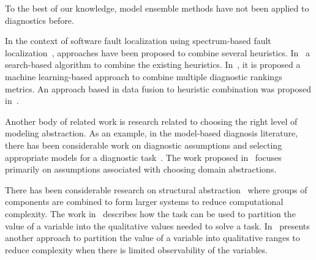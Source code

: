 To the best of our knowledge, model ensemble methods have not been applied to
diagnostics before.

In the context of software fault localization using spectrum-based fault
localization~\citep{abreu2007accuracy}, approaches have been proposed to combine
several heuristics. In~\citep{wang2011search} a search-based algorithm to combine
the existing heuristics. In~\citep{xuan2014learning}, it is proposed a machine
learning-based approach to combine multiple diagnostic rankings metrics. An approach
based in data fusion to heuristic combination was proposed in~\citep{lo2014fusion}.

Another body of related work is research related to choosing the right level of
modeling abstraction. As an example, in the model-based diagnosis literature,
there has been considerable work on diagnostic assumptions and selecting appropriate
models for a diagnostic task~\citep{struss1992s}. The work proposed in~\citep{de2007dynamic}
focuses primarily on assumptions associated with choosing domain abstractions.

There has been considerable research on structural abstraction~\citep{chittaro2004hierarchical,hamscher1990xde}
where groups of components are combined to form larger systems to reduce computational
complexity. The work in~\citep{sachenbacher2005task} describes how the task can be
used to partition the value of a variable into the qualitative values needed to solve a
task. In~\citep{torta2003automatic} presents another
approach to partition the value of a variable into qualitative ranges to reduce
complexity when there is limited observability of the variables.
